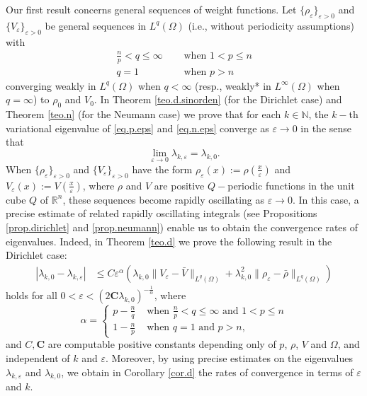 \documentclass[12pt]{amsart}
\theoremstyle{definition}
\theoremstyle{remark}
\numberwithin{equation}{section}
\begin{document}
Our first result concerns general sequences of weight functions. Let $\{\rho_\varepsilon\}_{\varepsilon>0}$ and $\{V_\varepsilon\}_{\varepsilon>0}$ be general sequences in $L^q(\Omega)$ (i.e., without periodicity assumptions)  with 
\begin{align} 
\frac{n}{p} < q\leq \infty &\quad \text{ when }1<p\leq n  \label{rel1}\\
q=1 &\quad \text{ when } p>n \label{rel2}
\end{align}
converging weakly in $L^q(\Omega)$ when $q<\infty$ (resp., weakly* in $L^\infty(\Omega)$ when $q=\infty$) to $\rho_0$ and $V_0$.
In Theorem \ref{teo.d.sinorden} (for the Dirichlet case) and Theorem \ref{teo.n} (for the Neumann case) we prove that for each $k\in \mathbb N$, the $k-$th variational eigenvalue of \eqref{eq.p.eps} and \eqref{eq.n.eps} converge as $\varepsilon\to 0$ in the sense that
$$
\lim_{\varepsilon\to 0} \lambda_{k,\varepsilon} = \lambda_{k,0}.
$$
When $\{\rho_\varepsilon\}_{\varepsilon>0}$ and $\{V_\varepsilon\}_{\varepsilon>0}$ have the form $\rho_\varepsilon(x):=\rho(\tfrac{x}{\varepsilon})$ and $V_\varepsilon(x):=V(\tfrac{x}{\varepsilon})$, where $\rho$ and $V$ are positive $Q-$periodic functions in the unit cube $Q$ of $\mathbb R^n$, these sequences become rapidly oscillating as $\varepsilon\to 0$.  In this case, a precise estimate of  related rapidly oscillating integrals (see Propositions \ref{prop.dirichlet} and \ref{prop.neumann}) enable us to obtain the  convergence rates of eigenvalues. Indeed, in Theorem \ref{teo.d} we prove the following result in the Dirichlet case:
\begin{align} \label{eqqi}
|\lambda_{k,0}-\lambda_{k,\varepsilon}| &\leq  
C  \varepsilon^\alpha \left(  \lambda_{k,0} \|V_\varepsilon - \bar V\|_{L^q(\Omega)} +     \lambda_{k,0}^2 \|\rho_\varepsilon - \bar \rho\|_{L^q(\Omega)}   \right)
\end{align}
holds for all $0<\varepsilon<(2\textbf{C} \lambda_{k,0})^{-\frac{1}{\alpha}}$, where 
$$
\alpha=
\begin{cases}
p-\frac{n}{q} & \text{ when } \frac{n}{p}<q\leq \infty  \text{ and } 1<p\leq n\\
1-\frac{n}{p} & \text{ when } q=1 \text{ and } p>n,
\end{cases}
$$
and $C,\textbf{C}$ are computable positive constants depending only of $p$,  $\rho$, $V$ and $\Omega$, and independent of $k$ and $\varepsilon$. Moreover, by using precise estimates on the eigenvalues $\lambda_{k,\varepsilon}$ and $\lambda_{k,0}$, we obtain in Corollary \ref{cor.d} the rates of convergence in terms of $\varepsilon$ and $k$.
\end{document}
